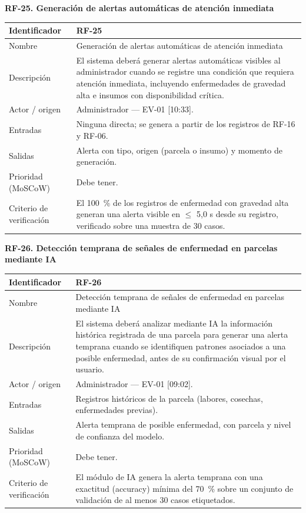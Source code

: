 \documentclass[12pt,a4paper]{article}
\begin{document}
\bigskip
\noindent\textbf{RF-25. Generación de alertas automáticas de atención inmediata}
\label{tab:RF-25}

\begin{center}
\begin{longtable}{|p{3.5cm}|p{10.7cm}|}
\hline
Identificador & RF-25 \\
\hline
Nombre & Generación de alertas automáticas de atención inmediata \\
\hline
Descripción & El sistema deberá generar alertas automáticas visibles al administrador cuando se registre una condición que requiera atención inmediata, incluyendo enfermedades de gravedad alta e insumos con disponibilidad crítica. \\
\hline
Actor / origen & Administrador --- EV-01 [10:33]. \\
\hline
Entradas & Ninguna directa; se genera a partir de los registros de RF-16 y RF-06. \\
\hline
Salidas & Alerta con tipo, origen (parcela o insumo) y momento de generación. \\
\hline
Prioridad (MoSCoW) & Debe tener. \\
\hline
Criterio de verificación & El 100~\% de los registros de enfermedad con gravedad alta generan una alerta visible en $\leq$ 5,0 s desde su registro, verificado sobre una muestra de 30 casos. \\
\hline
\end{longtable}
\end{center}

\bigskip
\noindent\textbf{RF-26. Detección temprana de señales de enfermedad en parcelas mediante IA}
\label{tab:RF-26}

\begin{center}
\begin{longtable}{|p{3.5cm}|p{10.7cm}|}
\hline
Identificador & RF-26 \\
\hline
Nombre & Detección temprana de señales de enfermedad en parcelas mediante IA \\
\hline
Descripción & El sistema deberá analizar mediante IA la información histórica registrada de una parcela para generar una alerta temprana cuando se identifiquen patrones asociados a una posible enfermedad, antes de su confirmación visual por el usuario. \\
\hline
Actor / origen & Administrador --- EV-01 [09:02]. \\
\hline
Entradas & Registros históricos de la parcela (labores, cosechas, enfermedades previas). \\
\hline
Salidas & Alerta temprana de posible enfermedad, con parcela y nivel de confianza del modelo. \\
\hline
Prioridad (MoSCoW) & Debe tener. \\
\hline
Criterio de verificación & El módulo de IA genera la alerta temprana con una exactitud (accuracy) mínima del 70~\% sobre un conjunto de validación de al menos 30 casos etiquetados. \\
\hline
\end{longtable}
\end{center}
\end{document}
